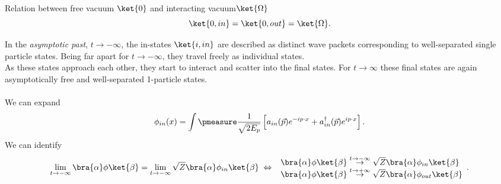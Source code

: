 \begin{mybox}{Relation between free vacuum $\ket{0}$ and interacting vacuum$\ket{\Omega}$}
		\begin{equation}
			\ket{0,in}=\ket{0,out} = \ket{\Omega}.
		\end{equation}
\end{mybox}
In the \emph{asymptotic past}, $t\rightarrow-\infty$, the in-states $\ket{i, in}$ are described as distinct wave packets corresponding to well-separated single particle states. Being far apart for $t\rightarrow-\infty$, they travel freely as individual states.\\
As these states approach each other, they start to interact and scatter into the final states. For $t\rightarrow\infty$ these final states are again asymptotically free and well-separated 1-particle states.\\
\\
We can expand
\begin{equation}
	\phi_{in}(x) = \int \pmeasure \frac{1}{\sqrt{2 E_p}} \left[a_{in}(\vec{p}) e^{- i p\cdot x} +a^{\dagger}_{in} (\vec{p}) e^{i p\cdot x}\right].
\end{equation}
We can identify
\begin{equation}
	\lim_{t\rightarrow - \infty} \bra{\alpha}\phi\ket{\beta} = \lim_{t\rightarrow - \infty} \sqrt{Z} \bra{\alpha}\phi_{in} \ket{\beta} \; \Leftrightarrow\; \begin{array}{lr}
	\bra{\alpha}\phi \ket{\beta} \stackrel{t \rightarrow - \infty}{\rightarrow} \sqrt{Z} \bra{\alpha}\phi_{in} \ket{\beta} \\
	\bra{\alpha}\phi \ket{\beta} \stackrel{t\rightarrow +\infty}{\rightarrow} \sqrt{Z} \bra{\alpha} \phi_{out} \ket{\beta}
	\end{array}.
\end{equation}
